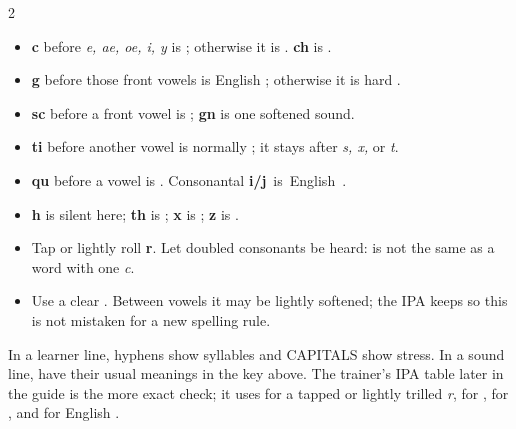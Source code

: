 \begin{multicols}{2}
\small
\begin{itemize}
\item \textbf{c} before \textit{e, ae, oe, i, y} is ; otherwise
  it is . \textbf{ch} is .
\item \textbf{g} before those front vowels is English ;
  otherwise it is hard .
\item \textbf{sc} before a front vowel is ; \textbf{gn} is
  one softened  sound.
\item \textbf{ti} before another vowel is normally ; it
  stays  after \textit{s, x,} or \textit{t}.
\item \textbf{qu} before a vowel is . Consonantal
  \mbox{\textbf{i/j} is English .}
\item \textbf{h} is silent here; \textbf{th} is ;
  \textbf{x} is ; \textbf{z} is .
\item Tap or lightly roll \textbf{r}. Let doubled consonants be heard:
   is not the same as a word with one \textit{c}.
\item Use a clear . Between vowels it may be lightly
  softened; the IPA keeps  so this is not mistaken for a new
  spelling rule.
\end{itemize}
\end{multicols}

In a learner line, hyphens show syllables and CAPITALS show stress. In a
sound line,  have their usual meanings
in the key above. The trainer's IPA table later in the guide is the more exact
check; it uses
 for a tapped or lightly trilled \textit{r},  for
,  for , and
 for English .

